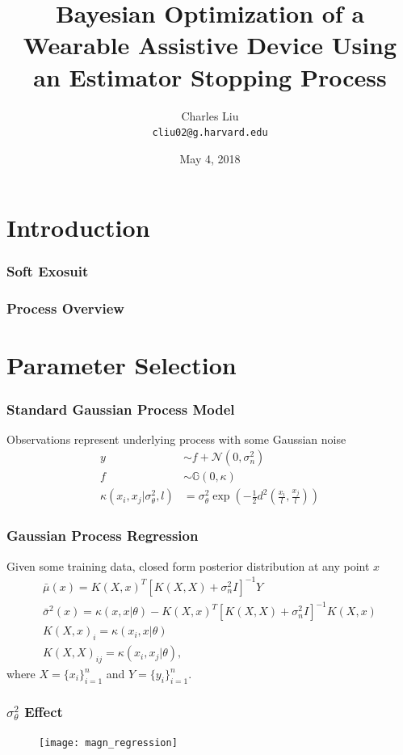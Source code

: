 \documentclass[compress, xcolor=pst]{beamer}
\title{Bayesian Optimization of a Wearable Assistive Device Using an Estimator Stopping Process}
\author[]{Charles Liu\\ \texttt{cliu02@g.harvard.edu}}
\institute{IACS, Harvard University}
\date{May 4, 2018}
\begin{document}
\frame{\titlepage}


\section{Introduction}
\begin{frame}
    \frametitle{\textbf{Soft Exosuit}}
\end{frame}

\begin{frame}
    \frametitle{\textbf{Process Overview}}
	\begin{figure}
		\centering
		\scalebox{.75}{}
	\end{figure}
\end{frame}

\section{Parameter Selection}
\begin{frame}
	\frametitle{\textbf{Standard Gaussian Process Model}}
	Observations represent underlying process with some Gaussian noise
	\begin{align*}
		y &\sim f + \mathcal{N}(0, \sigma_n^2)\\
		f &\sim \mathbb{G}(0, \kappa)\\
		\kappa(x_i, x_j \vert \sigma_\theta^2, l) &= \sigma_\theta^2 \exp(-\frac{1}{2}d^2(\frac{x_i}{l}, \frac{x_j}{l}))
	\end{align*}
\end{frame}

\begin{frame}
	\frametitle{\textbf{Gaussian Process Regression}}
	Given some training data, closed form posterior distribution at any point $x$
	\begin{gather*}
	  \bar{\mu}(x) = K(X, x)^T[K(X, X) + \sigma_n^2 I]^{-1}Y \\
	  \bar{\sigma}^2(x) = \kappa(x, x\vert \theta) - K(X, x)^T[K(X,X) + \sigma_n^2 I]^{-1}K(X,x) \\
	  K(X,x)_i = \kappa(x_i, x\vert \theta)\\
	  K(X,X)_{ij} = \kappa(x_i, x_j\vert \theta),
	\end{gather*}
	where $X = \{x_i\}_{i=1}^n$ and $Y = \{y_i\}_{i=1}^n$. 
\end{frame}

\begin{frame}
	\frametitle{\textbf{$\sigma_\theta^2$ Effect}}
	\begin{figure}
	\centering
	\texttt{[image: magn\_regression]}
	\end{figure}
\end{frame}
\end{document}
